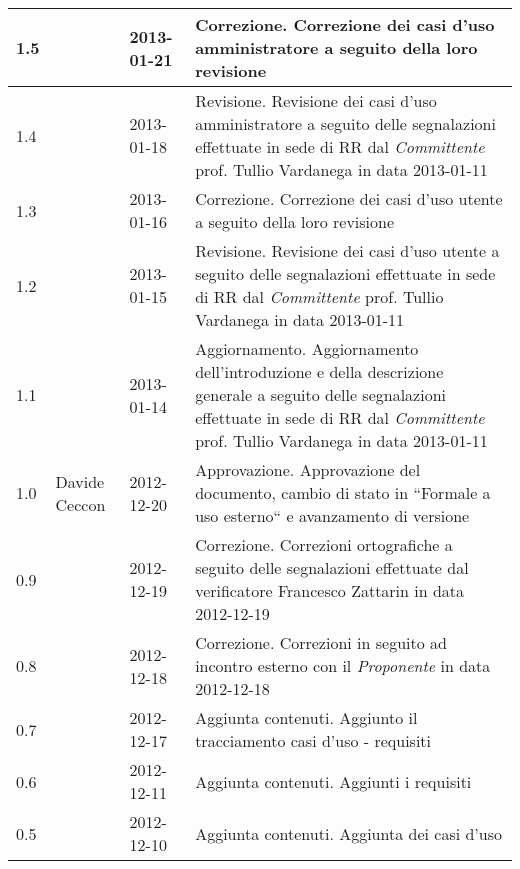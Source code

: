 \begin{longtable}{p{} p{} p{} p{}}
	    \midrule
		1.5 &	\EZ &	2013-01-21		& Correzione. \newline Correzione dei casi d'uso amministratore a seguito della loro revisione\\	    
	    \midrule
		1.4 &	\EZ &	2013-01-18		& Revisione. \newline Revisione dei casi d'uso amministratore a seguito delle segnalazioni effettuate in sede di RR dal \emph{Committente} prof. Tullio Vardanega in data 2013-01-11\\
	    \midrule
	    	1.3 &	\VP &	2013-01-16		& Correzione. \newline Correzione dei casi d'uso utente a seguito della loro revisione\\
	    \midrule
		1.2 &  \VP  &	2013-01-15		& Revisione. \newline Revisione dei casi d'uso utente a seguito delle segnalazioni effettuate in sede di RR dal \emph{Committente} prof. Tullio Vardanega in data 2013-01-11\\
	    \midrule
	    	1.1 &	\VP &	2013-01-14		& Aggiornamento. \newline Aggiornamento dell'introduzione e della descrizione generale a seguito delle segnalazioni effettuate in sede di RR dal \emph{Committente} prof. Tullio Vardanega in data 2013-01-11\\
	    \midrule
	    	1.0 &	Davide Ceccon	&	2012-12-20		& Approvazione. \newline Approvazione del documento, cambio di stato in ``Formale a uso esterno`` e avanzamento di versione\\
	    \midrule
	    	0.9 &	\MB	& 	2012-12-19		& Correzione. \newline Correzioni ortografiche a seguito delle segnalazioni effettuate dal verificatore Francesco Zattarin in data 2012-12-19\\
	    \midrule
	    	0.8 & 	\MB &	2012-12-18		& Correzione. \newline Correzioni in seguito ad incontro esterno con il \emph{Proponente} in data 2012-12-18\\
	    \midrule
	    	0.7 & 	\SL & 	2012-12-17		& Aggiunta contenuti. \newline Aggiunto il tracciamento casi d'uso - requisiti\\
	    \midrule 
	    	0.6 &	\SL &	2012-12-11 		& Aggiunta contenuti. \newline Aggiunti i requisiti \\
	    \midrule
	     	0.5 & 	\MB & 	2012-12-10 		& Aggiunta contenuti. \newline Aggiunta dei casi d'uso \\

\end{longtable}
